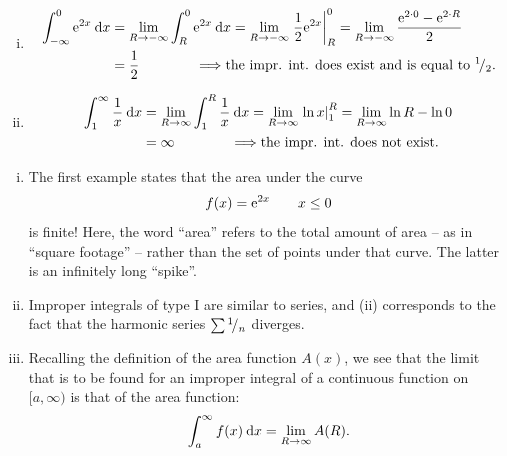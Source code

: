 \begin{example}[Type I]
\begin{enumerate}[(i)]
	\item 
\begin{equation*}
\begin{split}
\int_{-\infty}^{0} \mathrm{e}^{2x} \: \mathrm{d} x & = \lim_{R \to -\infty} \int_{R}^{0} \mathrm{e}^{2x} \: \mathrm{d} x
= \lim_{R \to -\infty} \left. \frac12 \mathrm{e}^{2x} \right|_R^0 
= \lim_{R \to -\infty} \frac{\mathrm{e}^{2 \cdot 0} - \mathrm{e}^{2 \cdot R}}{2} \\ 
& = \frac12 \qquad \qquad \Longrightarrow
\text{the impr. int. does exist and is equal to ${}^{1}\!/_{2}$.}
\end{split}
\end{equation*}
	\item
\begin{equation*}
\begin{split}
\int_{1}^{\infty} \frac1x \: \mathrm{d} x & = \lim_{R \to \infty} \int_{1}^{R} \frac1x \: \mathrm{d} x
= \lim_{R \to \infty} \left. \ln x \right|_1^R
= \lim_{R \to \infty} \ln R - \ln 0 \\
& = \infty \qquad \qquad \Longrightarrow \text{the impr. int. does not exist.}
\end{split}
\end{equation*}
\end{enumerate}
\end{example}

\begin{remark}
\begin{enumerate}[(i)]
	\item The first example states that the area under the curve
	\[ f(x) = \mathrm{e}^{2x} \qquad x\leq0 \]
	is finite! Here, the word ``area'' refers to the total amount of area -- as in ``square footage'' -- rather than the set of points under that curve. The latter is an infinitely long ``spike''.
	\item Improper integrals of type I are similar to series, and (ii) corresponds to the fact that the harmonic series $\sum {}^{1}\!/_{n}$ diverges.
	\item Recalling the definition of the area function $A(x)$, we see that the limit that is to be found for an improper integral of a continuous function on $[a,\infty)$ is that of the area function:
	\[ \int_{a}^{\infty} f(x) \: \mathrm{d} x = \lim_{R\to\infty} A(R). \]
\end{enumerate}
\end{remark}

